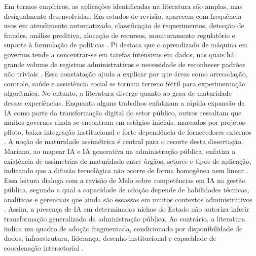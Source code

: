 \documentclass[12pt,a4paper]{article}
\begin{document}
Em termos empíricos, as aplicações identificadas na literatura são amplas, mas desigualmente desenvolvidas. Em estudos de revisão, aparecem com frequência usos em atendimento automatizado, classificação de requerimentos, detecção de fraudes, análise preditiva, alocação de recursos, monitoramento regulatório e suporte à formulação de políticas \autocite{madan2022ai} \autocite{serra2024a} \autocite{alhosani2024opportunities}. Pi destaca que o aprendizado de máquina em governos tende a concentrar-se em tarefas intensivas em dados, nas quais há grande volume de registros administrativos e necessidade de reconhecer padrões não triviais \autocite{pi2021machine}. Essa constatação ajuda a explicar por que áreas como arrecadação, controle, saúde e assistência social se tornam terreno fértil para experimentação algorítmica. No entanto, a literatura diverge quanto ao grau de maturidade dessas experiências. Enquanto alguns trabalhos enfatizam a rápida expansão da IA como parte da transformação digital do setor público, outros ressaltam que muitos governos ainda se encontram em estágios iniciais, marcados por projetos-piloto, baixa integração institucional e forte dependência de fornecedores externos \autocite{yiitcanlar2022artificial} \autocite{david2023understanding} \autocite{mariano2026inteligencia}.
A noção de maturidade assimétrica é central para o recorte desta dissertação. Mariano, ao mapear IA e IA generativa na administração pública, enfatiza a existência de assimetrias de maturidade entre órgãos, setores e tipos de aplicação, indicando que a difusão tecnológica não ocorre de forma homogênea nem linear \autocite{mariano2026inteligencia}. Essa leitura dialoga com a revisão de Melo sobre competências em IA na gestão pública, segundo a qual a capacidade de adoção depende de habilidades técnicas, analíticas e gerenciais que ainda são escassas em muitos contextos administrativos \autocite{melo2026competencias}. Assim, a presença de IA em determinados nichos do Estado não autoriza inferir transformação generalizada da administração pública. Ao contrário, a literatura indica um quadro de adoção fragmentada, condicionado por disponibilidade de dados, infraestrutura, liderança, desenho institucional e capacidade de coordenação intersetorial \autocite{madan2022ai} \autocite{sharma2021implementing}.
\end{document}
